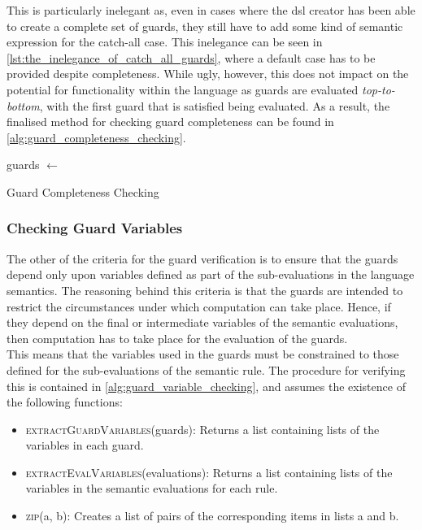 This is particularly inelegant as, even in cases where the \gls{dsl} creator has been able to create a complete set of guards, they still have to add some kind of semantic expression for the catch-all case. 
This inelegance can be seen in \autoref{lst:the_inelegance_of_catch_all_guards}, where a default case has to be provided despite completeness. 
While ugly, however, this does not impact on the potential for functionality within the language as guards are evaluated \textit{top-to-bottom}, with the first guard that is satisfied being evaluated. 
As a result, the finalised method for checking guard completeness can be found in \autoref{alg:guard_completeness_checking}.

\begin{algorithm}[!htb]
\begin{algorithmic}
    \State guards $\gets$ 
            \State {}
        \EndIf
    \EndFor
    \State {}
\EndFunction
\end{algorithmic}
\caption{Guard Completeness Checking}
\label{alg:guard_completeness_checking}
\end{algorithm}


\subsubsection{Checking Guard Variables} %
\label{ssub:checking_guard_variables}
The other of the criteria for the guard verification is to ensure that the guards depend only upon variables defined as part of the sub-evaluations in the language semantics.
The reasoning behind this criteria is that the guards are intended to restrict the circumstances under which computation can take place. 
Hence, if they depend on the final or intermediate variables of the semantic evaluations, then computation has to take place for the evaluation of the guards.\\

This means that the variables used in the guards must be constrained to those defined for the sub-evaluations of the semantic rule.
The procedure for verifying this is contained in \autoref{alg:guard_variable_checking}, and assumes the existence of the following functions:
\begin{itemize}
    \item \textsc{extractGuardVariables}(guards): Returns a list containing lists of the variables in each guard.
    \item \textsc{extractEvalVariables}(evaluations): Returns a list containing lists of the variables in the semantic evaluations for each rule.
    \item \textsc{zip}(a, b): Creates a list of pairs of the corresponding items in lists a and b.
\end{itemize}

